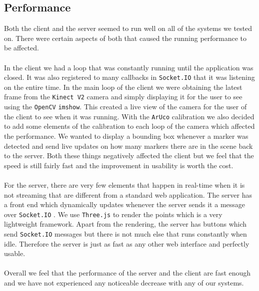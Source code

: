 \documentclass{article}
\begin{document}
\subsection{Performance}
Both the client and the server seemed to run well on all of the systems we tested on. There were certain aspects of both that caused the running performance to be affected.
\\\\
In the client we had a loop that was constantly running until the application was closed. It was also registered to many callbacks in \texttt{Socket.IO} \cite{socketio} that it was listening on the entire time. In the main loop of the client we were obtaining the latest frame from the \texttt{Kinect V2} camera and simply displaying it for the user to see using the \texttt{OpenCV} \cite{opencv} \texttt{imshow}. This created a live view of the camera for the user of the client to see when it was running. With the \texttt{ArUco} \cite{aruco} calibration we also decided to add some elements of the calibration to each loop of the camera which affected the performance. We wanted to display a bounding box whenever a marker was detected and send live updates on how many markers there are in the scene back to the server. Both these things negatively affected the client but we feel that the speed is still fairly fast and the improvement in usability is worth the cost.
\\\\
For the server, there are very few elements that happen in real-time when it is not streaming that are different from a standard web application. The server has a front end which dynamically updates whenever the server sends it a message over \texttt{Socket.IO} \cite{socketio}. We use \texttt{Three.js} \cite{three} to render the points which is a very lightweight framework. Apart from the rendering, the server has buttons which send \texttt{Socket.IO} \cite{socketio} messages but there is not much else that runs constantly when idle. Therefore the server is just as fast as any other web interface and perfectly usable.
\\\\
Overall we feel that the performance of the server and the client are
fast enough and we have not experienced any noticeable decrease with any of our systems.
\end{document}
